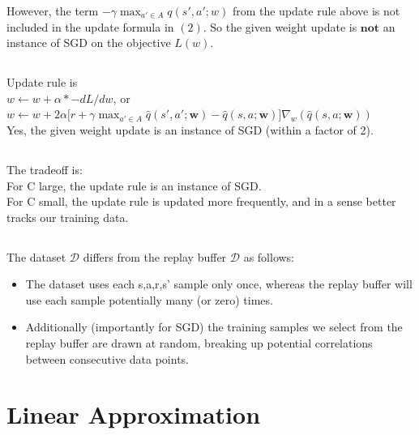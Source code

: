 \documentclass[10pt,a4paper]{article}
\begin{document}
  
  However, the term $-\gamma \max_{a' \in A} q(s',a';w)$ from the update rule above is not included in the update formula in $(2)$.  So the given weight update is $\boldsymbol{not}$ an instance of SGD on the objective $L(w)$.
  
  \subsection{}
  Update rule is \\
  $w \leftarrow w + \alpha * -dL/dw$, or \\
  $w \leftarrow w + 2\alpha \big[r + \gamma \max_{a' \in A} \hat{q}(s',a';\boldsymbol{w}) - \hat{q}(s,a;\boldsymbol{w})\big] \nabla_w ( \hat{q}(s,a;\boldsymbol{w}))$ \\
  
  Yes, the given weight update is an instance of SGD (within a factor of 2).

  \subsection{}
  The tradeoff is: \\
  For C large, the update rule is an instance of SGD. \\
  For C small, the update rule is updated more frequently, and in a sense better tracks our training data.

  \subsection{}
  The dataset $\mathcal{D}$ differs from the replay buffer $\mathcal{D}$ as follows: \\
  \begin{itemize}
  \item The dataset uses each s,a,r,s' sample only once, whereas the replay buffer will use each sample potentially many (or zero) times.
  \item Additionally (importantly for SGD) the training samples we select from the replay buffer are drawn at random, breaking up potential correlations between consecutive data points.
  \end{itemize}
  
  \section{Linear Approximation}
  
\end{document}
